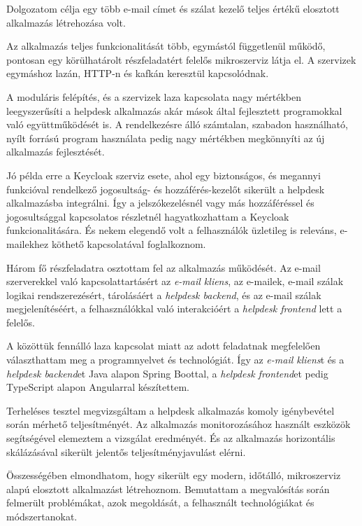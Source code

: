 Dolgozatom célja egy több e-mail címet és szálat kezelő teljes értékű elosztott alkalmazás létrehozása volt.

\bigskip
Az alkalmazás teljes funkcionalitását több, egymástól függetlenül működő, pontosan egy körülhatárolt részfeladatért felelős mikroszerviz látja el. A szervizek egymáshoz lazán, HTTP-n és kafkán keresztül kapcsolódnak.

A moduláris felépítés, és a szervizek laza kapcsolata nagy mértékben leegyszerűsíti a helpdesk alkalmazás akár mások által fejlesztett programokkal való együttműködését is. A rendelkezésre álló számtalan, szabadon használható, nyílt forrású program használata pedig nagy mértékben megkönnyíti az új alkalmazás fejlesztését.

Jó példa erre a Keycloak szerviz esete, ahol egy biztonságos, és megannyi funkcióval rendelkező jogosultság- és hozzáférés-kezelőt sikerült a helpdesk alkalmazásba integrálni. Így a jelszókezelésnél vagy más hozzáféréssel és jogosultsággal kapcsolatos részletnél hagyatkozhattam a Keycloak funkcionalitására. És nekem elegendő volt a felhasználók üzletileg is releváns, e-mailekhez köthető kapcsolatával foglalkoznom.

\bigskip
Három fő részfeladatra osztottam fel az alkalmazás működését. Az e-mail szerverekkel való kapcsolattartásért az \textit{e-mail kliens}, az e-mailek, e-mail szálak logikai rendszerezésért, tárolásáért a \textit{helpdesk backend}, és az e-mail szálak megjelenítéséért, a felhasználókkal való interakcióért a \textit{helpdesk frontend} lett a felelős.

A közöttük fennálló laza kapcsolat miatt az adott feladatnak megfelelően választhattam meg a programnyelvet és technológiát. Így az \textit{e-mail kliens}t és a \textit{helpdesk backend}et Java alapon Spring Boottal, a \textit{helpdesk frontend}et pedig TypeScript alapon Angularral készítettem.


\bigskip
Terheléses tesztel megvizsgáltam a helpdesk alkalmazás komoly igénybevétel során mérhető teljesítményét. Az alkalmazás monitorozásához használt eszközök segítségével elemeztem a vizsgálat eredményét. És az alkalmazás horizontális skálázásával sikerült jelentős teljesítményjavulást elérni.

\pagebreak
Összességében elmondhatom, hogy sikerült egy modern, időtálló, mikroszerviz alapú elosztott alkalmazást létrehoznom. Bemutattam a megvalósítás során felmerült problémákat, azok megoldását, a felhasznált technológiákat és módszertanokat.
